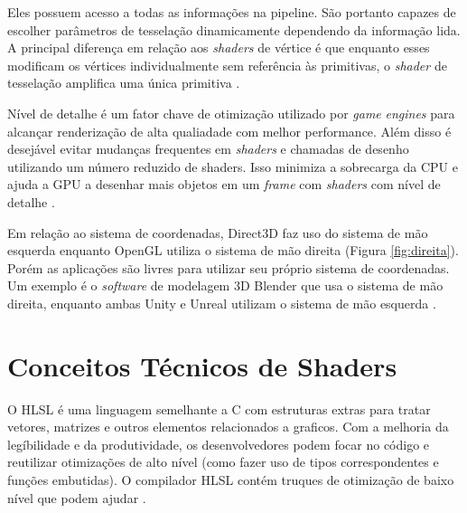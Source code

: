 Eles possuem acesso a todas as informações na pipeline. São portanto capazes de escolher parâmetros de tesselação dinamicamente dependendo da informação lida. A principal diferença em relação aos \textit{shaders} de vértice é que enquanto esses modificam os vértices individualmente sem referência às primitivas, o \textit{shader} de tesselação amplifica uma única primitiva \cite{hasu2018modern}.

Nível de detalhe é um fator chave de otimização utilizado por \textit{game} \textit{engines} para alcançar renderização de alta qualiadade com melhor performance. Além disso é desejável evitar mudanças frequentes em \textit{shaders} e chamadas de desenho utilizando um número reduzido de shaders. Isso minimiza a sobrecarga da CPU e ajuda a GPU a desenhar mais objetos em um \textit{frame} com \textit{shaders} com nível de detalhe \cite{yong2015rapid}.

Em relação ao sistema de coordenadas, Direct3D faz uso do sistema de mão esquerda enquanto OpenGL utiliza o sistema de mão direita (Figura \ref{fig:direita}). Porém as aplicações são livres para utilizar seu próprio sistema de coordenadas. Um exemplo é o \textit{software} de modelagem 3D Blender que usa o sistema de mão direita, enquanto ambas Unity e Unreal utilizam o sistema de mão esquerda \cite{hasu2018modern}.

	\begin{figure}[h!]
		\centering
	\end{figure}
	\nocite{direita}

\section{Conceitos Técnicos de Shaders}
\label{sec:conceitos-tecnicos-shaders}

O HLSL é uma linguagem semelhante a C com estruturas extras para tratar vetores, matrizes e outros elementos relacionados a graficos. Com a melhoria da legíbilidade e da produtividade, os desenvolvedores podem focar no código e reutilizar otimizações de alto nível (como fazer uso de tipos correspondentes e funções embutidas). O compilador HLSL contém truques de otimização de baixo nível que podem ajudar \cite{riguer2002performance}.

